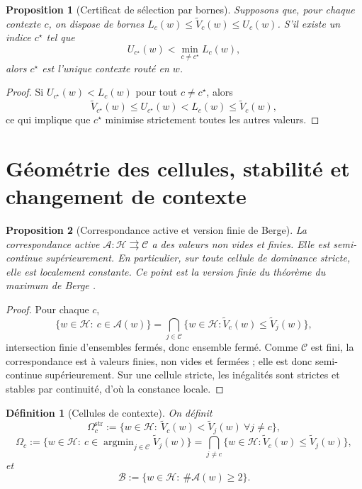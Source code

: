 \documentclass[11pt,a4paper]{article}
\newtheorem{definition}{Définition}[section]
\newtheorem{proposition}{Proposition}[section]
\DeclareMathOperator{\argmin}{argmin}
\newcommand{\Hh}{\mathcal H}
\newcommand{\Ccal}{\mathcal C}
\newcommand{\Acal}{\mathcal A}
\newcommand{\Bcal}{\mathcal B}
\begin{document}
\begin{proposition}[Certificat de sélection par bornes]
Supposons que, pour chaque contexte \(c\), on dispose de bornes \(L_c(w)\le \widetilde V_c(w)\le U_c(w)\). S'il existe un indice \(c^\star\) tel que
\[
U_{c^\star}(w) < \min_{c\neq c^\star} L_c(w),
\]
alors \(c^\star\) est l'unique contexte routé en \(w\).
\end{proposition}

\begin{proof}
Si \(U_{c^\star}(w) < L_c(w)\) pour tout \(c\neq c^\star\), alors
\[
\widetilde V_{c^\star}(w)\le U_{c^\star}(w)<L_c(w)\le \widetilde V_c(w),
\]
ce qui implique que \(c^\star\) minimise strictement toutes les autres valeurs.
\end{proof}

\section{Géométrie des cellules, stabilité et changement de contexte}

\begin{proposition}[Correspondance active et version finie de Berge]
La correspondance active \(\Acal:\Hh\rightrightarrows\Ccal\) a des valeurs non vides et finies. Elle est semi-continue supérieurement. En particulier, sur toute cellule de dominance stricte, elle est localement constante. Ce point est la version finie du théorème du maximum de Berge \cite{Berge1963}.
\end{proposition}

\begin{proof}
Pour chaque \(c\),
\[
\{w\in\Hh:\ c\in\Acal(w)\}
=
\bigcap_{j\in\Ccal}\{w\in\Hh:\widetilde V_c(w)\le \widetilde V_j(w)\},
\]
intersection finie d'ensembles fermés, donc ensemble fermé. Comme \(\Ccal\) est fini, la correspondance est à valeurs finies, non vides et fermées ; elle est donc semi-continue supérieurement. Sur une cellule stricte, les inégalités sont strictes et stables par continuité, d'où la constance locale.
\end{proof}

\begin{definition}[Cellules de contexte]
On définit
\[
\Omega_c^{\mathrm{str}}:=\{w\in\Hh:\ \widetilde V_c(w)<\widetilde V_j(w)\ \forall j\neq c\},
\]
\[
\Omega_c:=\{w\in\Hh:\ c\in\argmin_{j\in\Ccal}\widetilde V_j(w)\}
=\bigcap_{j\neq c}\{w\in\Hh:\widetilde V_c(w)\le \widetilde V_j(w)\},
\]
et
\[
\Bcal:=\{w\in\Hh:\ \#\Acal(w)\ge 2\}.
\]
\end{definition}
\end{document}
